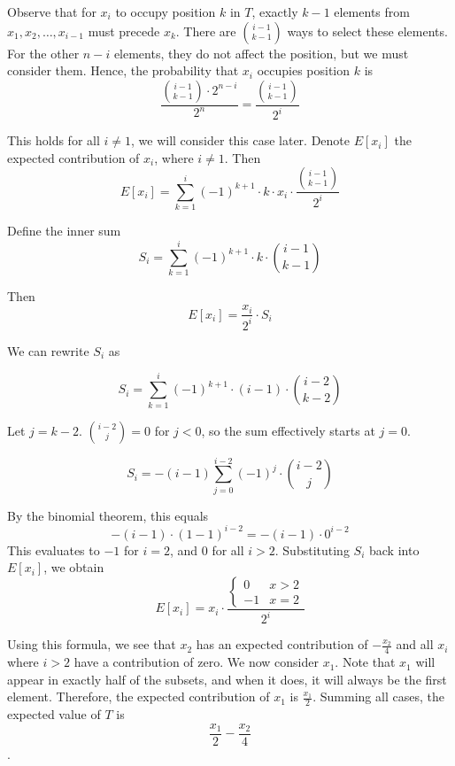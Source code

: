 \documentclass[11pt, letterpaper]{article}
\begin{document}
\begin{solution}{4}
\iffalse
Consider $x_1$; $\frac{1}{2}$ of all subsets will contain $x_1$. If $x_1 \in T$, it will be the first element. Therefore, the expected contribution of $x_1$ is $$\frac{1}{2}\cdot x_1$$. 

Consider $x_2$; $\frac{1}{2}$ of all subsets will contain $x_2$. If $x_2 \in T$, it will be the either the first or second element. If it is the first element, $x_1 \notin T$, being the second element if $x_1 \in T$. Therefore, the expected contribution of $x_2$ is $$\frac{1}{2}\cdot\frac{1}{2}\cdot x_2 + \frac{1}{2}\cdot\frac{1}{2}\cdot-2\cdot x_2 = -\frac{1}{4}\cdot x_2$$.
\fi
Observe that for $x_i$ to occupy position $k$ in $T$, exactly $k-1$ elements from ${x_1,x_2,\dotsc,x_{i-1}}$ must precede $x_k$. There are ${i-1 \choose k-1}$ ways to select these elements. For the other ${n-i}$ elements, they do not affect the position, but we must consider them. Hence, the probability that $x_i$ occupies position $k$ is $$\frac{{i-1 \choose k-1} \cdot 2^{n-i}}{2^n} = \frac{{i-1 \choose k-1}}{2^i}$$

This holds for all $i \neq 1$, we will consider this case later. Denote $E[x_i]$ the expected contribution of $x_i$, where $i \neq 1$. Then $$E[x_i] = \sum_{k=1}^{i}(-1)^{k+1}\cdot k \cdot x_i \cdot \frac{{i-1 \choose k-1}}{2^i}$$

Define the inner sum $$S_i = \sum_{k=1}^{i}(-1)^{k+1}\cdot k \cdot {i-1 \choose k-1}$$

Then $$E[x_i] = \frac{x_i}{2^i}\cdot S_i$$

We can rewrite $S_i$ as 

$$S_i = \sum_{k=1}^{i}(-1)^{k+1}\cdot {(i-1)} \cdot {i-2 \choose k-2}$$

Let $j = k - 2$. $\binom{i-2}{j} = 0$ for $j < 0$, so the sum effectively starts at $j = 0$. 

$$S_i = -{(i-1)}\sum_{j=0}^{i-2}(-1)^{j} \cdot {i-2 \choose j}$$

By the binomial theorem, this equals $$-{(i-1)}\cdot(1-1)^{i-2} = -{(i-1)}\cdot0^{i-2}$$ This evaluates to $-1$ for $i = 2$, and $0$ for all $i > 2$. Substituting $S_i$ back into $E[x_i]$, we obtain $$E[x_i] = x_i \cdot \frac{\begin{cases} 
      0 &x > 2 \\
      -1 &  x = 2 
   \end{cases}}{2^i}
$$

Using this formula, we see that $x_2$ has an expected contribution of $-\frac{x_2}{4}$ and all $x_i$ where $i > 2$ have a contribution of zero. We now consider $x_1$. Note that $x_1$ will appear in exactly half of the subsets, and when it does, it will always be the first element. Therefore, the expected contribution of $x_1$ is $\frac{x_1}{2}$. Summing all cases, the expected value of $T$ is $$\boxed{\frac{x_1}{2} - \frac{x_2}{4}}$$.

\end{solution}
\end{document}
